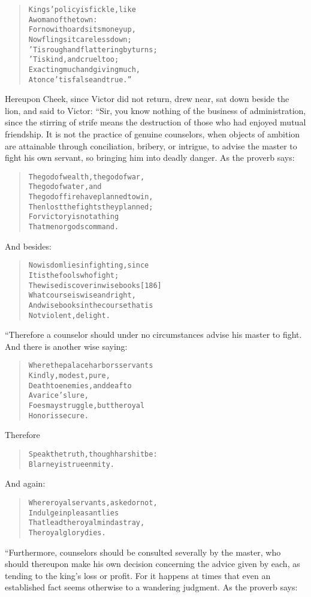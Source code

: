 \documentclass[article, twoside, 14pt]{memoir}
\renewenvironment{verbatim}{%
\begin{quote}%
\vskip -10pt%
\begin{alltt}\normalfont\large}{\end{alltt}%
\end{quote}%
\vskip -10pt
} %
\begin{document}
\begin{verbatim}
Kings' policy is fickle, like
    A woman of the town:
For now it hoards its money up,
    Now flings it careless down;
'Tis rough and flattering by turns;
    'Tis kind, and cruel too;
Exacting much and giving much,
    At once 'tis false and true.”
\end{verbatim}
Hereupon Cheek, since Victor did not return, drew near, sat down
beside the lion, and said to Victor: “Sir, you know nothing of the
business of administration, since the stirring of strife means the
destruction of those who had enjoyed mutual friendship. It is not
the practice of genuine counselors, when objects of ambition are
attainable through conciliation, bribery, or intrigue, to advise
the master to fight his own servant, so bringing him into deadly
danger. As the proverb says:

\begin{verbatim}
The god of wealth, the god of war,
    The god of water, and
The god of fire have planned to win,
    Then lost the fights they planned;
For victory is not a thing
    That men or gods command.
\end{verbatim}
And besides:

\begin{verbatim}
No wisdom lies in fighting, since
    It is the fools who fight;
The wise discover in wise books                         [186]
    What course is wise and right,
And wise books in the course that is
    Not violent, delight.
\end{verbatim}
“Therefore a counselor should under no circumstances advise his
master to fight. And there is another wise saying:

\begin{verbatim}
Where the palace harbors servants
    Kindly, modest, pure,
Death to enemies, and deaf to
    Avarice's lure,
Foes may struggle, but the royal
    Honor is secure.
\end{verbatim}
Therefore

\begin{verbatim}
Speak the truth, though harsh it be:
Blarney is true enmity.
\end{verbatim}
And again:

\begin{verbatim}
Where royal servants, asked or not,
    Indulge in pleasant lies
That lead the royal mind astray,
    The royal glory dies.
\end{verbatim}
“Furthermore, counselors should be consulted severally by the
master, who should thereupon make his own decision concerning the
advice given by each, as tending to the king's loss or profit. For
it happens at times that even an established fact seems otherwise
to a wandering judgment. As the proverb says:
\end{document}
